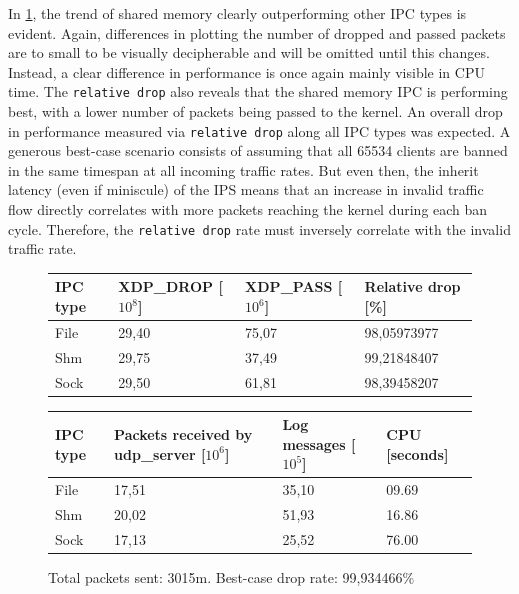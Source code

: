 In \ref{fig:data:ipv4:10m:65534}, the trend of shared memory clearly outperforming other \ac{IPC} types is evident.
Again, differences in plotting the number of dropped and passed packets are to small to be visually decipherable and will be omitted until this changes.
Instead, a clear difference in performance is once again mainly visible in \ac{CPU} time.
The \texttt{relative drop} also reveals that the shared memory \ac{IPC} is performing best, with a lower number of packets being passed to the kernel.
An overall drop in performance measured via \texttt{relative drop} along all \ac{IPC} types was expected.
A generous best-case scenario consists of assuming that all 65534 clients are banned in the same timespan at all incoming traffic rates.
But even then, the inherit latency (even if miniscule) of the \ac{IPS} means that an increase in invalid traffic flow directly correlates with more packets reaching the kernel during each ban cycle.
Therefore, the \texttt{relative drop} rate must inversely correlate with the invalid traffic rate.

\begin{figure}[!h]
	\centering
	\scriptsize
	\begin{tabular}{llll}
		\toprule
		\textbf{IPC type} & \textbf{XDP\_DROP [$10^8$]} & \textbf{XDP\_PASS [$10^6$]} & \textbf{Relative drop [\%]} \\ \midrule 
		File & 29,40 & 75,07 & 98,05973977 \\
        Shm & 29,75 & 37,49 & 99,21848407 \\
        Sock & 29,50 & 61,81 & 98,39458207 \\
	\bottomrule
	\end{tabular}
    \begin{tabular}{llll}
		\toprule
		\textbf{IPC type} & \textbf{Packets received by udp\_server [$10^6$]} & \textbf{Log messages [$10^5$]} & \textbf{CPU [seconds]} \\ \midrule 
		File & 17,51 & 35,10 & 09.69 \\
        Shm & 20,02 & 51,93 & 16.86 \\
        Sock & 17,13 & 25,52 & 76.00 \\
	\bottomrule
	\end{tabular}
	\caption[Simplefail2ban, IPv4, 10m \ac{PPS}, 65534 malicious clients]{Total packets sent: 3015m. Best-case drop rate: 99,934466\%}
	\label{fig:data:ipv4:10m:65534}
\end{figure}

